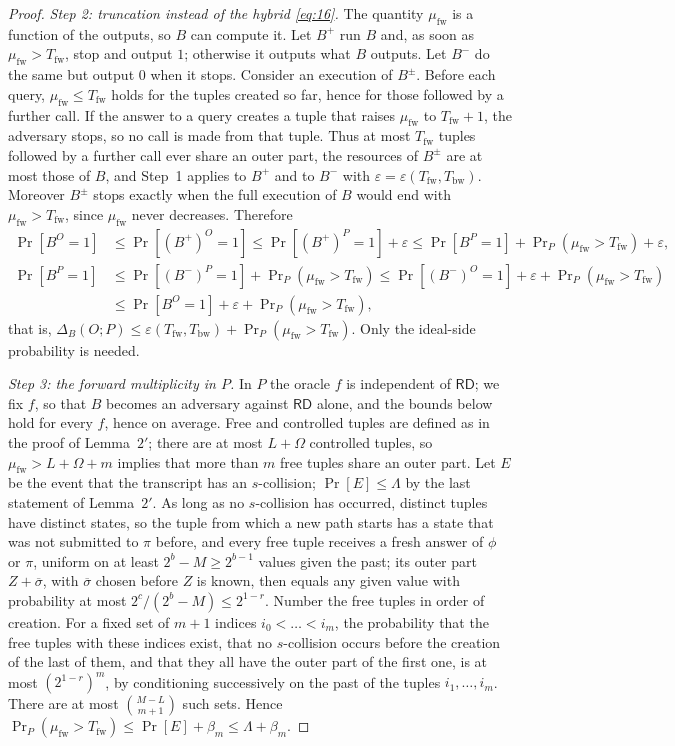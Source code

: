 \documentclass[11pt,a4paper]{article}
\theoremstyle{definition}
\theoremstyle{remark}
\newcommand{\RD}{\mathsf{RD}}
\newcommand{\outp}[1]{\overline{#1}}
\newcommand{\mufw}{\mu_{\mathrm{fw}}}
\newcommand{\Tfw}{T_{\mathrm{fw}}}
\newcommand{\Tbw}{T_{\mathrm{bw}}}
\begin{document}
\begin{proof}
\emph{Step 2: truncation instead of the hybrid \eqref{eq:16}.} The quantity $\mufw$ is a function of the outputs, so $B$
can compute it. Let $B^+$ run $B$ and, as soon as $\mufw > \Tfw$, stop and output $1$; otherwise it outputs what $B$
outputs. Let $B^-$ do the same but output $0$ when it stops. Consider an execution of $B^\pm$. Before each query, $\mufw \le \Tfw$ holds for the tuples created so far, hence
for those followed by a further call. If the answer to a query creates a tuple that raises $\mufw$ to $\Tfw + 1$, the
adversary stops, so no call is made from that tuple. Thus at most $\Tfw$ tuples followed by a further call ever share
an outer part, the resources of $B^\pm$ are at most those of $B$, and Step~1 applies to $B^+$ and to $B^-$ with
$\varepsilon = \varepsilon(\Tfw, \Tbw)$. Moreover $B^\pm$ stops exactly when the full execution of $B$ would end with $\mufw > \Tfw$, since
$\mufw$ never decreases. Therefore
\begin{align*}
\Pr[B^O = 1] &\le \Pr[(B^+)^O = 1] \le \Pr[(B^+)^P = 1] + \varepsilon \le \Pr[B^P = 1] + \Pr\nolimits_P(\mufw > \Tfw) + \varepsilon, \\
\Pr[B^P = 1] &\le \Pr[(B^-)^P = 1] + \Pr\nolimits_P(\mufw > \Tfw) \le \Pr[(B^-)^O = 1] + \varepsilon + \Pr\nolimits_P(\mufw > \Tfw) \\
 &\le \Pr[B^O = 1] + \varepsilon + \Pr\nolimits_P(\mufw > \Tfw),
\end{align*}
that is, $\Delta_B(O ; P) \le \varepsilon(\Tfw, \Tbw) + \Pr_P(\mufw > \Tfw)$. Only the ideal-side probability is needed.

\emph{Step 3: the forward multiplicity in $P$.} In $P$ the oracle $f$ is independent of $\RD$; we fix $f$, so that $B$
becomes an adversary against $\RD$ alone, and the bounds below hold for every $f$, hence on average. Free and
controlled tuples are defined as in the proof of Lemma~$2'$; there are at most $L + \Omega$ controlled tuples, so
$\mufw > L + \Omega + m$ implies that more than $m$ free tuples share an outer part. Let $E$ be the event that the
transcript has an $s$-collision; $\Pr[E] \le \Lambda$ by the last statement of Lemma~$2'$. As long as no $s$-collision has
occurred, distinct tuples have distinct states, so the tuple from which a new path starts has a state that was not
submitted to $\pi$ before, and every free tuple receives a fresh answer of $\phi$ or $\pi$, uniform on at least
$2^b - M \ge 2^{b-1}$ values given the past; its outer part $Z + \outp{\sigma}$, with $\outp{\sigma}$ chosen before $Z$ is known, then
equals any given value with probability at most $2^c/(2^b - M) \le 2^{1-r}$. Number the free tuples in order of creation.
For a fixed set of $m + 1$ indices $i_0 < \dots < i_m$, the probability that the free tuples with these indices exist, that
no $s$-collision occurs before the creation of the last of them, and that they all have the outer part of the first
one, is at most $(2^{1-r})^m$, by conditioning successively on the past of the tuples $i_1, \dots, i_m$. There are at most
$\binom{M-L}{m+1}$ such sets. Hence
$\Pr_P(\mufw > \Tfw) \le \Pr[E] + \beta_m \le \Lambda + \beta_m$.


\end{proof}
\end{document}
